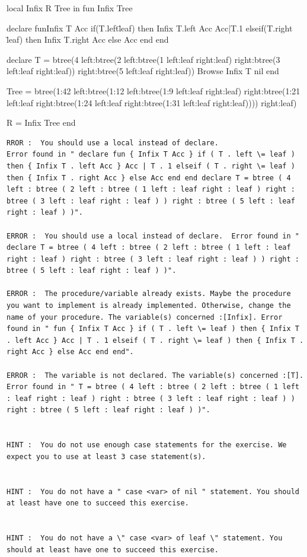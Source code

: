 \documentclass[11pt,a4paper,twoside,openright]{report}
\begin{document}
\begin{OZ}
local Infix R Tree in 
	fun {Infix Tree}

declare
fun{Infix T Acc}
   if(T.left\=leaf) then
      {Infix T.left Acc}
      Acc|T.1
   elseif(T.right \= leaf) then
      {Infix T.right Acc}
   else
      Acc
   end
end

declare
T = btree(4 left:btree(2 left:btree(1 left:leaf right:leaf)
                                   right:btree(3 left:leaf right:leaf))
	  right:btree(5 left:leaf right:leaf))
{Browse {Infix T nil}}	end
	

	Tree = btree(1:42 left:btree(1:12 left:btree(1:9 left:leaf right:leaf) 
right:btree(1:21 left:leaf right:btree(1:24 left:leaf right:btree(1:31 
left:leaf right:leaf)))) right:leaf)
	
	R = {Infix Tree}
end
\end{OZ}
\begin{lstlisting}
RROR :  You should use a local instead of declare.  
Error found in " declare fun { Infix T Acc } if ( T . left \= leaf ) then { Infix T . left Acc } Acc | T . 1 elseif ( T . right \= leaf ) then { Infix T . right Acc } else Acc end end declare T = btree ( 4 left : btree ( 2 left : btree ( 1 left : leaf right : leaf ) right : btree ( 3 left : leaf right : leaf ) ) right : btree ( 5 left : leaf right : leaf ) )".

ERROR :  You should use a local instead of declare.  Error found in " declare T = btree ( 4 left : btree ( 2 left : btree ( 1 left : leaf right : leaf ) right : btree ( 3 left : leaf right : leaf ) ) right : btree ( 5 left : leaf right : leaf ) )".

ERROR :  The procedure/variable already exists. Maybe the procedure you want to implement is already implemented. Otherwise, change the name of your procedure. The variable(s) concerned :[Infix]. Error found in " fun { Infix T Acc } if ( T . left \= leaf ) then { Infix T . left Acc } Acc | T . 1 elseif ( T . right \= leaf ) then { Infix T . right Acc } else Acc end end".

ERROR :  The variable is not declared. The variable(s) concerned :[T]. Error found in " T = btree ( 4 left : btree ( 2 left : btree ( 1 left : leaf right : leaf ) right : btree ( 3 left : leaf right : leaf ) ) right : btree ( 5 left : leaf right : leaf ) )".


HINT :  You do not use enough case statements for the exercise. We expect you to use at least 3 case statement(s).


HINT :  You do not have a " case <var> of nil " statement. You should at least have one to succeed this exercise.


HINT :  You do not have a \" case <var> of leaf \" statement. You should at least have one to succeed this exercise.
\end{lstlisting}
\end{document}
